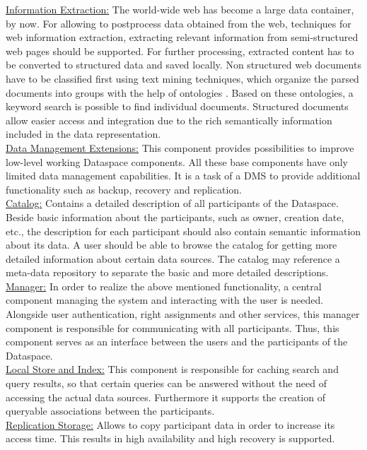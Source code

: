 \uline{Information Extraction:} The world-wide web has become a large data container, by now. For allowing to postprocess data obtained from the web, techniques for web information extraction, extracting relevant information from semi-structured web pages should be supported. For further processing, extracted content has to be converted to structured data and saved locally. Non structured web documents have to be classified first using text mining techniques, which organize the parsed documents into groups with the help of ontologies \cite{conf/wise/HeQZW04}. Based on these ontologies, a keyword search is possible to find individual documents. Structured documents allow easier access and integration due to the rich semantically information included in the data representation.\\
\uline{Data Management Extensions:} This component provides possibilities to improve low-level working Dataspace components. All these base components have only limited data management capabilities. It is a task of a DMS to provide additional functionality such as backup, recovery and replication.\\
\uline{Catalog:} Contains a detailed description of all participants of the Dataspace. Beside basic information about the participants, such as owner, creation date, etc., the description for each participant should also contain semantic information about its data. A user should be able to browse the catalog for getting more detailed information about certain data sources. The catalog may reference a meta-data repository to separate the basic and more detailed descriptions.\\
\uline{Manager:} In order to realize the above mentioned functionality, a central component managing the system and interacting with the user is needed. Alongside user authentication, right assignments and other services, this manager component is responsible for communicating with all participants. Thus, this component serves as an interface between the users and the participants of the Dataspace.\\
\uline{Local Store and Index:} This component is responsible for caching search and query results, so that certain queries can be answered without the need of accessing the actual data sources. Furthermore it supports the creation of queryable associations between the participants.\\
\uline{Replication Storage:} Allows to copy participant data in order to increase its access time. This results in high availability and high recovery is supported.\\
